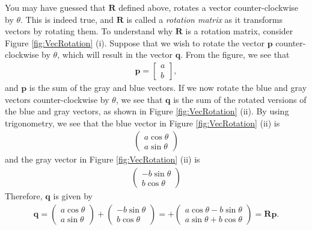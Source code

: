 You may have guessed that $\mathbf{R}$ defined above, rotates a vector counter-clockwise by $\theta$. This is indeed true, and $\mathbf{R}$ is called a \emph{rotation matrix} as it transforms vectors by rotating them. To understand why $\mathbf{R}$ is a rotation matrix, consider Figure \ref{fig:VecRotation} (i). Suppose that we wish to rotate the vector $\mathbf{p}$ counter-clockwise by $\theta$, which will result in the vector $\mathbf{q}$. From the figure, we see that
\begin{align}
\mathbf{p} =
\begin{bmatrix}
a \\ b
\end{bmatrix},
\end{align}
and $\mathbf{p}$ is the sum of the gray and blue vectors. If we now rotate the blue and gray vectors counter-clockwise by $\theta$, we see that $\mathbf{q}$ is the sum of the rotated versions of the blue and gray vectors, as shown in  Figure \ref{fig:VecRotation} (ii).  By using trigonometry, we see that the blue vector in  Figure \ref{fig:VecRotation} (ii) is
\begin{align}
\begin{pmatrix}
a\cos \theta\\
a \sin \theta
\end{pmatrix}
\end{align}
and the gray vector in  Figure \ref{fig:VecRotation} (ii) is
\begin{align}
\begin{pmatrix}
-b\sin \theta\\
b \cos \theta
\end{pmatrix}
\end{align}
Therefore, $\mathbf{q}$ is given by
\begin{align}
\mathbf{q}=
\begin{pmatrix}
a\cos \theta\\
a \sin \theta
\end{pmatrix}
+\begin{pmatrix}
-b\sin \theta\\
b \cos \theta
\end{pmatrix}=
+\begin{pmatrix}
a\cos \theta-b\sin \theta\\
a \sin \theta + b \cos \theta
\end{pmatrix} =\mathbf{Rp}.
\end{align}



